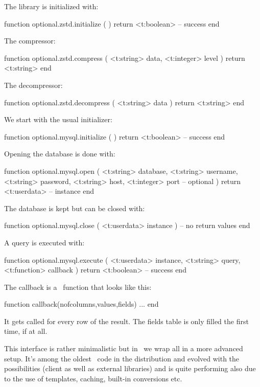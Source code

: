 \startsubsubsubject[title=zstd]

The library is initialized with:

\starttyping[option=LUA]
function optional.zstd.initialize ( )
    return <t:boolean> -- success
end
\stoptyping

The compressor:

\starttyping[option=LUA]
function optional.zstd.compress (
    <t:string>  data,
    <t:integer> level
)
    return <t:string>
end
\stoptyping

The decompressor:

\starttyping[option=LUA]
function optional.zstd.decompress ( <t:string> data )
    return <t:string>
end
\stoptyping

\stopsubsubsubject

\stopsubsection

\startsubsection[title=Databases]

\startsubsubsubject[title=mysql]

We start with the usual initializer:

\starttyping[option=LUA]
function optional.mysql.initialize ( )
    return <t:boolean> -- success
end
\stoptyping

Opening the database is done with:

\starttyping[option=LUA]
function optional.mysql.open (
    <t:string>  database,
    <t:string>  username,
    <t:string>  password,
    <t:string>  host,
    <t:integer> port -- optional
)
    return <t:userdata> -- instance
end
\stoptyping

The database is kept  but can be closed with:

\starttyping[option=LUA]
function optional.mysql.close ( <t:userdata> instance )
    -- no return values
end
\stoptyping

A query is executed with:

\starttyping[option=LUA]
function optional.mysql.execute (
    <t:userdata> instance,
    <t:string>   query,
    <t:function> callback
)
    return <t:boolean> -- success
end
\stoptyping

The callback is a \LUA\ function that looks like this:

\starttyping[option=LUA]
function callback(nofcolumns,values,fields)
    ...
end
\stoptyping

It gets called for every row of the result. The fields table is only filled the
first time, if at all.

This interface is rather minimalistic but in \CONTEXT\ we wrap all in a more
advanced setup. It's among the oldest \LUA\ code in the distribution and evolved
with the possibilities (client as well as external libraries) and is quite
performing also due to the use of templates, caching, built-in conversions etc.

